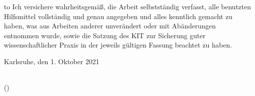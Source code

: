 
\thispagestyle{empty}
\null\vfill
\noindent\hbox to \textwidth{\hrulefill} 
%
{Ich versichere wahrheitsgemäß, die Arbeit selbstständig verfasst, alle benutzten Hilfsmittel
vollständig und genau angegeben und alles kenntlich gemacht zu haben, was aus
Arbeiten anderer unverändert oder mit Abänderungen entnommen wurde, sowie die
Satzung des KIT zur Sicherung guter wissenschaftlicher Praxis in der jeweils gültigen
Fassung beachtet zu haben.}
 
 

\vspace{1.5cm}
Karlsruhe, den 1. Oktober 2021
\vspace{1.5cm}
 
\dotfill\hspace*{9.45cm}\\
\hspace*{1.9cm}(\theauthor) 
\cleardoublepage